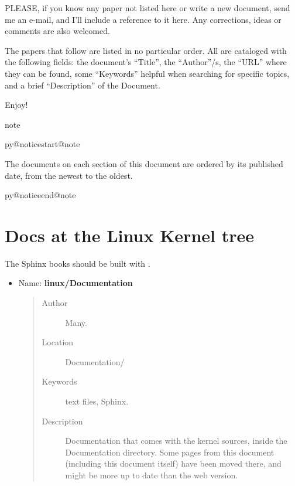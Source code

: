 \documentclass[a4paper,8pt,english]{sphinxmanual}
\makeatletter
\renewenvironment{notice}[2]{%
          \def\py@noticetype{#1}
          \begin{coloredbox}{#1}
          \bf\it
          \par\strong{#2}
          \csname py@noticestart@#1\endcsname
        }
	{
          \csname py@noticeend@\py@noticetype\endcsname
          \end{coloredbox}
        }
\makeatother
\begin{document}
PLEASE, if you know any paper not listed here or write a new document,
send me an e-mail, and I'll include a reference to it here. Any
corrections, ideas or comments are also welcomed.

The papers that follow are listed in no particular order. All are
cataloged with the following fields: the document's ``Title'', the
``Author''/s, the ``URL'' where they can be found, some ``Keywords'' helpful
when searching for specific topics, and a brief ``Description'' of the
Document.

Enjoy!

\begin{notice}{note}{Note:}
The documents on each section of this document are ordered by its
published date, from the newest to the oldest.
\end{notice}


\section{Docs at the Linux Kernel tree}
\label{process/kernel-docs:docs-at-the-linux-kernel-tree}
The Sphinx books should be built with .
\begin{itemize}
\item {} 
Name: \textbf{linux/Documentation}
\begin{quote}\begin{description}
\item[{Author}] \leavevmode
Many.

\item[{Location}] \leavevmode
Documentation/

\item[{Keywords}] \leavevmode
text files, Sphinx.

\item[{Description}] \leavevmode
Documentation that comes with the kernel sources,
inside the Documentation directory. Some pages from this document
(including this document itself) have been moved there, and might
be more up to date than the web version.

\end{description}\end{quote}

\end{itemize}
\end{document}
